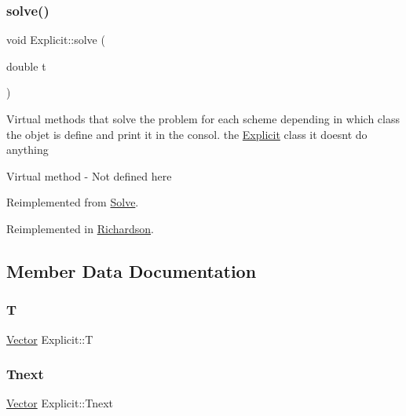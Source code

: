 \subsubsection{\texorpdfstring{solve()}{solve()}}
{\footnotesize\ttfamily void Explicit\+::solve (\begin{DoxyParamCaption}\item[{double}]{t }\end{DoxyParamCaption})\hspace{0.3cm}{\ttfamily [virtual]}}

Virtual methods that solve the problem for each scheme depending in which class the objet is define and print it in the consol.  the \hyperlink{class_explicit}{Explicit} class it doesn\textquotesingle{}t do anything

Virtual method -\/ Not defined here 

Reimplemented from \hyperlink{class_solve_a1a56722993fdabea9928637d7dd8a2c7}{Solve}.



Reimplemented in \hyperlink{class_richardson_ab8dd2ff0e58c11092fead4d45a4f5c64}{Richardson}.



\subsection{Member Data Documentation}
\mbox{\label{class_explicit_ae53d46a9f687aa478f8641a86f9e8555}} 
\subsubsection{\texorpdfstring{T}{T}}
{\footnotesize\ttfamily \hyperlink{class_vector}{Vector} Explicit\+::T}

\mbox{\label{class_explicit_ac8dbd124708dde54d99dfe2fc9b4851a}} 
\subsubsection{\texorpdfstring{Tnext}{Tnext}}
{\footnotesize\ttfamily \hyperlink{class_vector}{Vector} Explicit\+::\+Tnext}

\mbox{\label{class_explicit_a901bd7294da6e25d9b3c8851653c37dc}} 
